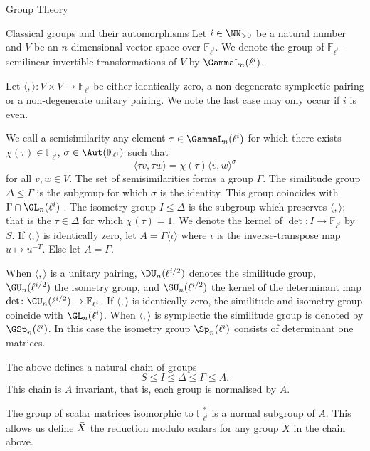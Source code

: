 \documentclass[11pt,a4paper]{article}
\newcommand{\Fli}{\mathbb{F}_{\ell^i}}
\newcommand{\lihalf}{{\ell^{i/2}}}
\begin{document}
\begin{section}{Group Theory}
\label{section_group_theory}
\begin{subsection}{Classical groups and their automorphisms}
\label{subsection_classical_groups_and_their_automorphisms}
Let $i \in \NN_{>0}$ be a natural number and $V$ be an $n$-dimensional vector space over $\Fli$. 
We denote the group of $\Fli$-semilinear invertible transformations of $V$ by $\GammaL_n(\ell^i)$. 

Let $\langle , \rangle \colon V \times V \rightarrow \Fli$ be either identically zero, a non-degenerate symplectic pairing or a non-degenerate unitary pairing.
We note the last case may only occur if $i$ is even.

We call a semisimilarity any element $\tau \in \GammaL_n(\ell^i)$ for which there exists $\chi(\tau) \in \Fli$, $\sigma \in \Aut(\Fli)$ such that
\[\langle \tau v, \tau w \rangle = \chi(\tau) \langle  v,  w \rangle^\sigma\]
for all $v,w \in V$.
The set of semisimilarities forms a group $\Gamma$.
The similitude group $\Delta \leq \Gamma$ is the subgroup for which $\sigma$ is the identity. This group coincides with $\Gamma \cap \GL_n(\ell^i)$ \cite[Lemma 2.1.2 (iv)]{KleidmanLiebeck}.
The isometry group $I \leq \Delta$ is the subgroup which preserves $\langle, \rangle$; that is the $\tau \in \Delta$ for which $\chi(\tau)=1$.
We denote the kernel of $\det\colon I \rightarrow \Fli$ by $S$.
If $\langle, \rangle$ is identically zero, let $A=\Gamma\langle \iota \rangle$ where $\iota$ is the inverse-transpose map $u \mapsto u^{-T}$. Else let $A=\Gamma$.

When $\langle, \rangle$ is a unitary pairing, $\DU_n(\lihalf)$ denotes the similitude group,
$\GU_n(\lihalf)$ the isometry group,
and $\SU_n(\lihalf)$ the kernel of the determinant map $\det \colon \GU_n(\lihalf) \rightarrow \Fli$. If $\langle, \rangle$ is identically zero, the similitude and isometry group coincide with $\GL_n(\ell^i)$.
When $\langle, \rangle$ is symplectic the similitude group is denoted by $\GSp_n(\ell^i)$. In this case the isometry group $\Sp_n(\ell^i)$ consists of determinant one matrices.

The above defines a natural chain of groups
\[S \leq I \leq \Delta \leq \Gamma \leq A.\]
This chain is $A$ invariant, that is, each group is normalised by $A$.

The group of scalar matrices isomorphic to $\Fli^*$ is a normal subgroup of $A$.
This allows us define $\Bar{X}$ the reduction modulo scalars for any group $X$ in the chain above.


\end{subsection}
\end{section}
\end{document}
